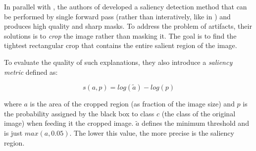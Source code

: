 \documentclass[12pt, twoside, a4paper]{report}
\begin{document}
In parallel with \cite{fong}, the authors of \cite{real_time_image_saliency} developed a saliency detection method that can be performed by single forward pass (rather than interatively, like in \cite{obj-detectors}) and produces high quality and sharp masks. To address the problem of artifacts, their solutions is to \textit{crop} the image rather than masking it. The goal is to find the tightest rectangular crop that contains the entire salient region of the image.



To evaluate the quality of such explanations, they also introduce a \textit{saliency metric} defined as:

\begin{equation}\label{eqn:saliency-metric}
s(a,p) = log(\widetilde{a}) - log(p)
\end{equation}

where $a$ is the area of the cropped region (as fraction of the image size) and $p$ is the probability assigned by the black box to class $c$ (the class of the original image) when feeding it the cropped image. $\widetilde{a}$ defines the minimum threshold and is just $max(a,0.05)$. The lower this value, the more precise is the saliency region.
\end{document}
